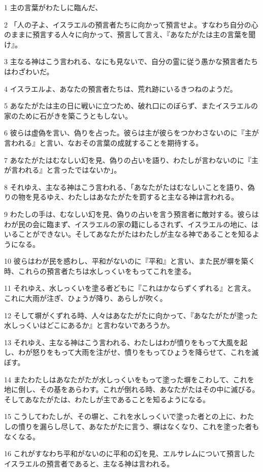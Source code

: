 \par 1 主の言葉がわたしに臨んだ、
\par 2 「人の子よ、イスラエルの預言者たちに向かって預言せよ。すなわち自分の心のままに預言する人々に向かって、預言して言え、『あなたがたは主の言葉を聞け』。
\par 3 主なる神はこう言われる、なにも見ないで、自分の霊に従う愚かな預言者たちはわざわいだ。
\par 4 イスラエルよ、あなたの預言者たちは、荒れ跡にいるきつねのようだ。
\par 5 あなたがたは主の日に戦いに立つため、破れ口にのぼらず、またイスラエルの家のために石がきを築こうともしない。
\par 6 彼らは虚偽を言い、偽りを占った。彼らは主が彼らをつかわさないのに『主が言われる』と言い、なおその言葉の成就することを期待する。
\par 7 あなたがたはむなしい幻を見、偽りの占いを語り、わたしが言わないのに『主が言われる』と言ったではないか」。
\par 8 それゆえ、主なる神はこう言われる、「あなたがたはむなしいことを語り、偽りの物を見るゆえ、わたしはあなたがたを罰すると主なる神は言われる。
\par 9 わたしの手は、むなしい幻を見、偽りの占いを言う預言者に敵対する。彼らはわが民の会に臨まず、イスラエルの家の籍にしるされず、イスラエルの地に、はいることができない。そしてあなたがたはわたしが主なる神であることを知るようになる。
\par 10 彼らはわが民を惑わし、平和がないのに『平和』と言い、また民が塀を築く時、これらの預言者たちは水しっくいをもってこれを塗る。
\par 11 それゆえ、水しっくいを塗る者どもに『これはかならずくずれる』と言え。これに大雨が注ぎ、ひょうが降り、あらしが吹く。
\par 12 そして塀がくずれる時、人々はあなたがたに向かって、『あなたがたが塗った水しっくいはどこにあるか』と言わないであろうか。
\par 13 それゆえ、主なる神はこう言われる、わたしはわが憤りをもって大風を起し、わが怒りをもって大雨を注がせ、憤りをもってひょうを降らせて、これを滅ぼす。
\par 14 またわたしはあなたがたが水しっくいをもって塗った塀をこわして、これを地に倒し、その基をあらわす。これが倒れる時、あなたがたはその中に滅びる。そしてあなたがたは、わたしが主であることを知るようになる。
\par 15 こうしてわたしが、その塀と、これを水しっくいで塗った者との上に、わたしの憤りを漏らし尽して、あなたがたに言う、塀はなくなり、これを塗った者もなくなる。
\par 16 これがすなわち平和がないのに平和の幻を見、エルサレムについて預言したイスラエルの預言者であると、主なる神は言われる。
